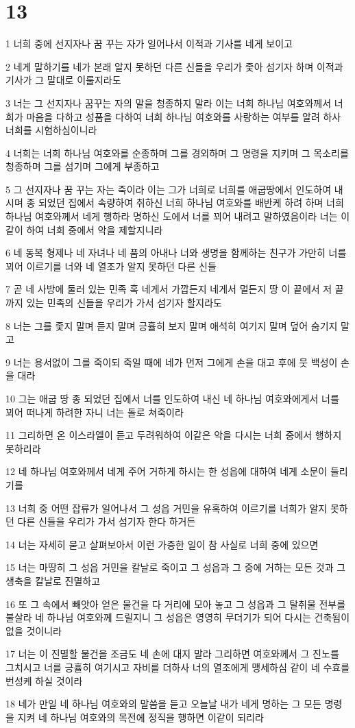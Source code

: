 \chapter{13}

\par 1 너희 중에 선지자나 꿈 꾸는 자가 일어나서 이적과 기사를 네게 보이고
\par 2 네게 말하기를 네가 본래 알지 못하던 다른 신들을 우리가 좇아 섬기자 하며 이적과 기사가 그 말대로 이룰지라도
\par 3 너는 그 선지자나 꿈꾸는 자의 말을 청종하지 말라 이는 너희 하나님 여호와께서 너희가 마음을 다하고 성품을 다하여 너희 하나님 여호와를 사랑하는 여부를 알려 하사 너희를 시험하심이니라
\par 4 너희는 너희 하나님 여호와를 순종하며 그를 경외하며 그 명령을 지키며 그 목소리를 청종하며 그를 섬기며 그에게 부종하고
\par 5 그 선지자나 꿈 꾸는 자는 죽이라 이는 그가 너희로 너희를 애굽땅에서 인도하여 내시며 종 되었던 집에서 속량하여 취하신 너희 하나님 여호와를 배반케 하려 하며 너희 하나님 여호와께서 네게 행하라 명하신 도에서 너를 꾀어 내려고 말하였음이라 너는 이같이 하여 너희 중에서 악을 제할지니라
\par 6 네 동복 형제나 네 자녀나 네 품의 아내나 너와 생명을 함께하는 친구가 가만히 너를 꾀어 이르기를 너와 네 열조가 알지 못하던 다른 신들
\par 7 곧 네 사방에 둘러 있는 민족 혹 네게서 가깝든지 네게서 멀든지 땅 이 끝에서 저 끝까지 있는 민족의 신들을 우리가 가서 섬기자 할지라도
\par 8 너는 그를 좇지 말며 듣지 말며 긍휼히 보지 말며 애석히 여기지 말며 덮어 숨기지 말고
\par 9 너는 용서없이 그를 죽이되 죽일 때에 네가 먼저 그에게 손을 대고 후에 뭇 백성이 손을 대라
\par 10 그는 애굽 땅 종 되었던 집에서 너를 인도하여 내신 네 하나님 여호와에게서 너를 꾀어 떠나게 하려한 자니 너는 돌로 쳐죽이라
\par 11 그리하면 온 이스라엘이 듣고 두려워하여 이같은 악을 다시는 너희 중에서 행하지 못하리라
\par 12 네 하나님 여호와께서 네게 주어 거하게 하시는 한 성읍에 대하여 네게 소문이 들리기를
\par 13 너희 중 어떤 잡류가 일어나서 그 성읍 거민을 유혹하여 이르기를 너희가 알지 못하던 다른 신들을 우리가 가서 섬기자 한다 하거든
\par 14 너는 자세히 묻고 살펴보아서 이런 가증한 일이 참 사실로 너희 중에 있으면
\par 15 너는 마땅히 그 성읍 거민을 칼날로 죽이고 그 성읍과 그 중에 거하는 모든 것과 그 생축을 칼날로 진멸하고
\par 16 또 그 속에서 빼앗아 얻은 물건을 다 거리에 모아 놓고 그 성읍과 그 탈취물 전부를 불살라 네 하나님 여호와께 드릴지니 그 성읍은 영영히 무더기가 되어 다시는 건축됨이 없을 것이니라
\par 17 너는 이 진멸할 물건을 조금도 네 손에 대지 말라 그리하면 여호와께서 그 진노를 그치시고 너를 긍휼히 여기시고 자비를 더하사 너의 열조에게 맹세하심 같이 네 수효를 번성케 하실 것이라
\par 18 네가 만일 네 하나님 여호와의 말씀을 듣고 오늘날 내가 네게 명하는 그 모든 명령을 지켜 네 하나님 여호와의 목전에 정직을 행하면 이같이 되리라

